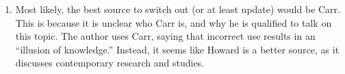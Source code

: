 \documentclass[12pt]{article}
\begin{document}
\begin{enumerate}
      \item Most likely, the best source to switch out (or at least update) would be Carr. This is because it is unclear who Carr is, and why he is qualified to talk on this topic. The author uses Carr, saying that incorrect use results in an ``illusion of knowledge.'' Instead, it seems like Howard is a better source, as it discusses contemporary research and studies.

    \end{enumerate}
\end{document}
